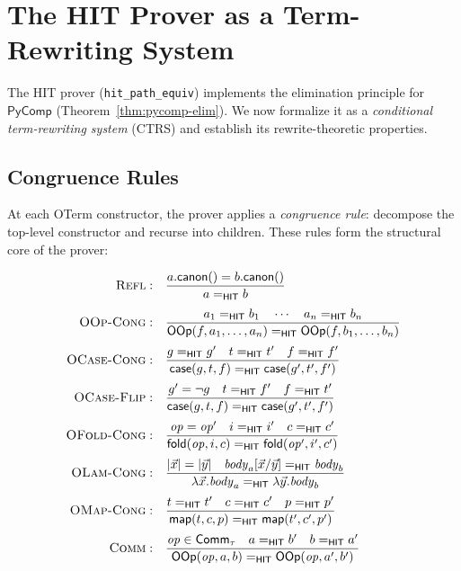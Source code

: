 \documentclass[11pt,a4paper]{report}
\theoremstyle{definition}
\theoremstyle{plain}
\newcommand{\fold}{\mathsf{fold}}
\begin{document}
\section{The HIT Prover as a Term-Rewriting System}
\label{sec:hit-rewrite-system}

The HIT prover (\texttt{hit\_path\_equiv}) implements the
elimination principle for $\mathsf{PyComp}$
(Theorem~\ref{thm:pycomp-elim}).  We now formalize it as a
\emph{conditional term-rewriting system} (CTRS) and establish its
rewrite-theoretic properties.

\subsection{Congruence Rules}

At each OTerm constructor, the prover applies a \emph{congruence rule}:
decompose the top-level constructor and recurse into children.
These rules form the structural core of the prover:

\[
\begin{array}{rl}
\textsc{Refl}: & \displaystyle
  \frac{a.\mathsf{canon}() = b.\mathsf{canon}()}
       {a =_{\mathsf{HIT}} b} \\[12pt]
\textsc{OOp-Cong}: & \displaystyle
  \frac{a_1 =_{\mathsf{HIT}} b_1 \quad \cdots \quad a_n =_{\mathsf{HIT}} b_n}
       {\mathsf{OOp}(f, a_1, \ldots, a_n) =_{\mathsf{HIT}} \mathsf{OOp}(f, b_1, \ldots, b_n)} \\[12pt]
\textsc{OCase-Cong}: & \displaystyle
  \frac{g =_{\mathsf{HIT}} g' \quad t =_{\mathsf{HIT}} t' \quad f =_{\mathsf{HIT}} f'}
       {\mathsf{case}(g, t, f) =_{\mathsf{HIT}} \mathsf{case}(g', t', f')} \\[12pt]
\textsc{OCase-Flip}: & \displaystyle
  \frac{g' = \lnot g \quad t =_{\mathsf{HIT}} f' \quad f =_{\mathsf{HIT}} t'}
       {\mathsf{case}(g, t, f) =_{\mathsf{HIT}} \mathsf{case}(g', t', f')} \\[12pt]
\textsc{OFold-Cong}: & \displaystyle
  \frac{\mathit{op} = \mathit{op}' \quad i =_{\mathsf{HIT}} i' \quad c =_{\mathsf{HIT}} c'}
       {\fold(\mathit{op}, i, c) =_{\mathsf{HIT}} \fold(\mathit{op}', i', c')} \\[12pt]
\textsc{OLam-Cong}: & \displaystyle
  \frac{|\vec{x}| = |\vec{y}| \quad \mathit{body}_a[\vec{x}/\vec{y}] =_{\mathsf{HIT}} \mathit{body}_b}
       {\lambda\vec{x}.\mathit{body}_a =_{\mathsf{HIT}} \lambda\vec{y}.\mathit{body}_b} \\[12pt]
\textsc{OMap-Cong}: & \displaystyle
  \frac{t =_{\mathsf{HIT}} t' \quad c =_{\mathsf{HIT}} c' \quad p =_{\mathsf{HIT}} p'}
       {\mathsf{map}(t, c, p) =_{\mathsf{HIT}} \mathsf{map}(t', c', p')} \\[12pt]
\textsc{Comm}: & \displaystyle
  \frac{\mathit{op} \in \mathsf{Comm}_\tau \quad a =_{\mathsf{HIT}} b' \quad b =_{\mathsf{HIT}} a'}
       {\mathsf{OOp}(\mathit{op}, a, b) =_{\mathsf{HIT}} \mathsf{OOp}(\mathit{op}, a', b')}
\end{array}
\]
\end{document}
